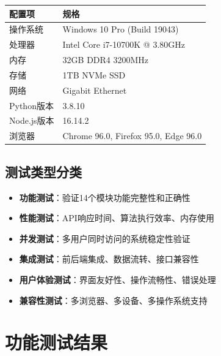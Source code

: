 \documentclass[12pt,a4paper]{article}
\begin{document}
\begin{table}[H]
\centering
\begin{tcolorbox}[
    colback=light,
    colframe=primary,
    title={\textbf{测试环境配置}},
    coltitle=white,
    colbacktitle=primary,
    fonttitle=\bfseries,
    rounded corners=5pt,
    width=0.95\textwidth
]
\begin{tabular}{ll}
\toprule
\rowcolor{primary!20}
\textbf{配置项} & \textbf{规格} \\
\midrule
操作系统 & Windows 10 Pro (Build 19043) \\
\rowcolor{light}
处理器 & Intel Core i7-10700K @ 3.80GHz \\
内存 & 32GB DDR4 3200MHz \\
\rowcolor{light}
存储 & 1TB NVMe SSD \\
网络 & Gigabit Ethernet \\
\rowcolor{light}
Python版本 & 3.8.10 \\
Node.js版本 & 16.14.2 \\
\rowcolor{light}
浏览器 & Chrome 96.0, Firefox 95.0, Edge 96.0 \\
\bottomrule
\end{tabular}
\end{tcolorbox}
\end{table}

\subsection{测试类型分类}

\begin{testresult}[title={测试分类覆盖}]
\begin{itemize}[nosep]
    \item \textbf{功能测试}：验证14个模块功能完整性和正确性
    \item \textbf{性能测试}：API响应时间、算法执行效率、内存使用
    \item \textbf{并发测试}：多用户同时访问的系统稳定性验证
    \item \textbf{集成测试}：前后端集成、数据流转、接口兼容性
    \item \textbf{用户体验测试}：界面友好性、操作流畅性、错误处理
    \item \textbf{兼容性测试}：多浏览器、多设备、多操作系统支持
\end{itemize}
\end{testresult}

\section{功能测试结果}
\end{document}
